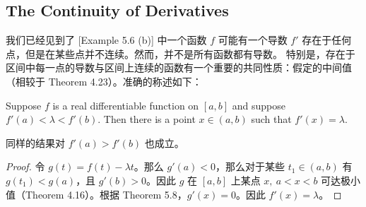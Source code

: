 \documentclass[../poma-notes.tex]{subfiles}
\begin{document}
\newpage
\subsection*{The Continuity of Derivatives}

我们已经见到了 [Example 5.6 (b)] 中一个函数 $f$ 可能有一个导数 $f'$ 存在于任何点，但是在某些点并不连续。然而，并不是所有函数都有导数。
特别是，存在于区间中每一点的导数与区间上连续的函数有一个重要的共同性质：假定的中间值（相较于 Theorem 4.23）。准确的称述如下：

\begin{theorem}
  Suppose $f$ is a real differentiable function on $[a, b]$ and suppose $f'(a) < \lambda < f'(b)$. Then there is a
  point $x \in (a, b)$ such that $f'(x) = \lambda$.
\end{theorem}

同样的结果对 $f'(a) > f'(b)$ 也成立。

\begin{proof}
  令 $g(t) = f(t) - \lambda t$。那么 $g'(a) < 0$，那么对于某些 $t_1 \in (a,b)$ 有 $g(t_1) < g(a)$，且 $g'(b) > 0$。因此
  $g$ 在 $[a, b]$ 上某点 $x,\ a<x<b$ 可达极小值（Theorem 4.16）。根据 Theorem 5.8，$g'(x) = 0$。因此 $f'(x) = \lambda$。
\end{proof}
\end{document}

